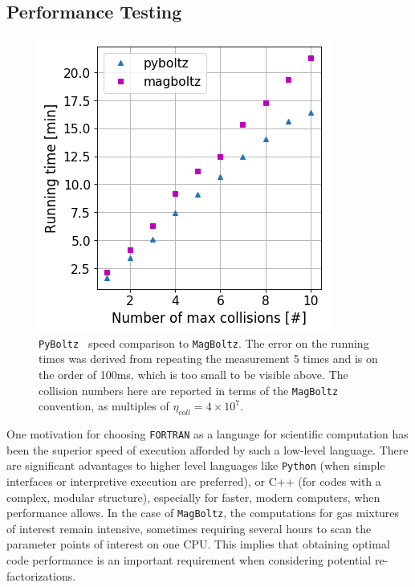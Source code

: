 \documentclass[3p,11pt]{elsarticle}
\begin{document}
\subsection{Performance Testing}
\begin{figure}
\begin{centering}
\includegraphics[width=0.5\columnwidth]{Figures/PyBoltz_Pref.png}
\par\end{centering}
\caption{ {\tt PyBoltz }  speed comparison to {\tt MagBoltz}. The error on the running times was derived from repeating the measurement 5 times and is on the order of 100ms, which is too small to be visible above.  The collision numbers here are reported in terms of the {\tt MagBoltz} convention, as multiples of $\eta_{coll}=4\times10^7$.
\label{fig:PyBoltz_Pref}}
\end{figure}

One motivation for choosing {\tt FORTRAN} as a language for scientific computation has been the superior speed of execution afforded by such a low-level language.   There are significant advantages to higher level languages like {\tt Python} (when simple interfaces or interpretive execution are preferred), or C++ (for codes with a complex, modular structure), especially for faster, modern computers, when performance allows.  In the case of {\tt MagBoltz}, the computations for gas mixtures of interest remain intensive, sometimes requiring several hours to scan the parameter points of interest on one CPU. This implies that obtaining optimal code performance is an important requirement when considering potential re-factorizations.
\end{document}
